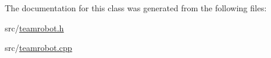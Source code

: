 The documentation for this class was generated from the following files:\begin{DoxyCompactItemize}
\item 
src/\hyperlink{teamrobot_8h}{teamrobot.h}\item 
src/\hyperlink{teamrobot_8cpp}{teamrobot.cpp}\end{DoxyCompactItemize}
